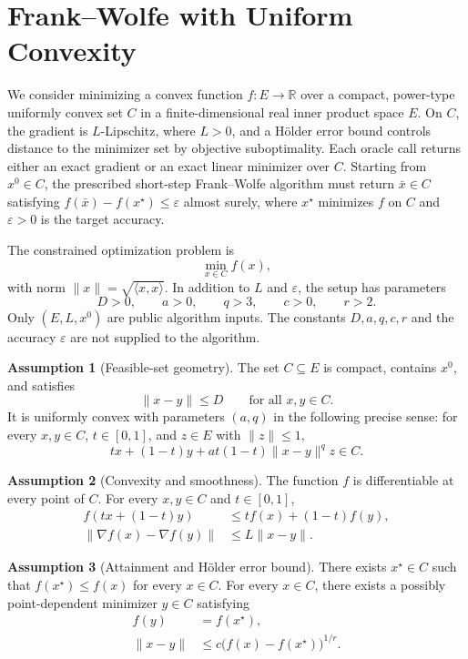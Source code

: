 \documentclass[10pt]{article}
\theoremstyle{definition}
\newtheorem{assumption}{Assumption}
\begin{document}
\section*{Frank--Wolfe with Uniform Convexity}
We consider minimizing a convex function $f:E\to\mathbb{R}$ over a compact, power-type uniformly convex set $C$ in a finite-dimensional real inner product space $E$. On $C$, the gradient is $L$-Lipschitz, where $L>0$, and a H\"older error bound controls distance to the minimizer set by objective suboptimality. Each oracle call returns either an exact gradient or an exact linear minimizer over $C$. Starting from $x^0\in C$, the prescribed short-step Frank--Wolfe algorithm must return $\bar{x}\in C$ satisfying $f(\bar{x})-f(x^\star)\leq\varepsilon$ almost surely, where $x^\star$ minimizes $f$ on $C$ and $\varepsilon>0$ is the target accuracy.

The constrained optimization problem is
\[
\min_{x\in C} f(x),
\]
with norm $\|x\|=\sqrt{\langle x,x\rangle}$. In addition to $L$ and $\varepsilon$, the setup has parameters
\[
D>0,\qquad a>0,\qquad q>3,\qquad c>0,\qquad r>2.
\]
Only $(E,L,x^0)$ are public algorithm inputs. The constants $D,a,q,c,r$ and the accuracy $\varepsilon$ are not supplied to the algorithm.

\begin{assumption}[Feasible-set geometry]
The set $C\subseteq E$ is compact, contains $x^0$, and satisfies
\[
\|x-y\|\leq D\qquad\text{for all }x,y\in C.
\]
It is uniformly convex with parameters $(a,q)$ in the following precise sense: for every $x,y\in C$, $t\in[0,1]$, and $z\in E$ with $\|z\|\leq1$,
\[
tx+(1-t)y+a t(1-t)\|x-y\|^q z\in C.
\]
\end{assumption}

\begin{assumption}[Convexity and smoothness]
The function $f$ is differentiable at every point of $C$. For every $x,y\in C$ and $t\in[0,1]$,
\begin{align*}
f(tx+(1-t)y)&\leq t f(x)+(1-t)f(y),\\
\|\nabla f(x)-\nabla f(y)\|&\leq L\|x-y\|.
\end{align*}
\end{assumption}

\begin{assumption}[Attainment and H\"older error bound]
There exists $x^\star\in C$ such that $f(x^\star)\leq f(x)$ for every $x\in C$. For every $x\in C$, there exists a possibly point-dependent minimizer $y\in C$ satisfying
\begin{align*}
f(y)&=f(x^\star),\\
\|x-y\|&\leq c\bigl(f(x)-f(x^\star)\bigr)^{1/r}.
\end{align*}
\end{assumption}
\end{document}
